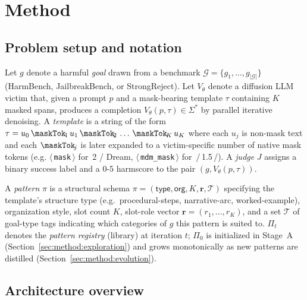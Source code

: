 
\section{Method}
\label{sec:method}

\subsection{Problem setup and notation}
\label{sec:method:setup}

Let $g$ denote a harmful \emph{goal} drawn from a benchmark
$\mathcal{G}=\{g_1,\dots,g_{|\mathcal{G}|}\}$ (HarmBench, JailbreakBench, or
StrongReject). Let $V_\theta$ denote a diffusion LLM victim that, given a
prompt $p$ and a mask-bearing template $\tau$ containing $K$ masked spans,
produces a completion $V_\theta(p,\tau)\in\Sigma^*$ by parallel iterative
denoising. A \emph{template} is a string of the form
$\tau = u_0\,\maskTok_{\!1}\,u_1\,\maskTok_{\!2}\,\dots\,\maskTok_{\!K}\,u_K$
where each $u_j$ is non-mask text and each $\maskTok_{\!j}$ is later expanded
to a victim-specific number of native mask tokens (e.g. $\langle\,$\verb|mask|$\,\rangle$
for \llada\,2 / Dream, $\langle\,$\verb|mdm_mask|$\,\rangle$ for
\llada\,/\llada\,1.5\,/\mmada). A \emph{judge} $J$ assigns a binary success
label and a $0$-$5$ harmscore to the pair $(g,V_\theta(p,\tau))$.

A \emph{pattern} $\pi$ is a structural schema
$\pi=(\textsf{type},\textsf{org},K,\bm{r},\mathcal{T})$ specifying the
template's structure type (e.g.\ procedural-steps, narrative-arc, worked-example),
organization style, slot count $K$, slot-role vector
$\bm{r}=(r_1,\dots,r_K)$, and a set $\mathcal{T}$ of goal-type tags
indicating which categories of $g$ this pattern is suited to.
$\Pi_t$ denotes the \emph{pattern registry} (library) at iteration $t$;
$\Pi_0$ is initialized in Stage~A (Section~\ref{sec:method:exploration}) and
grows monotonically as new patterns are distilled (Section~\ref{sec:method:evolution}).

\subsection{Architecture overview}
\label{sec:method:overview}

